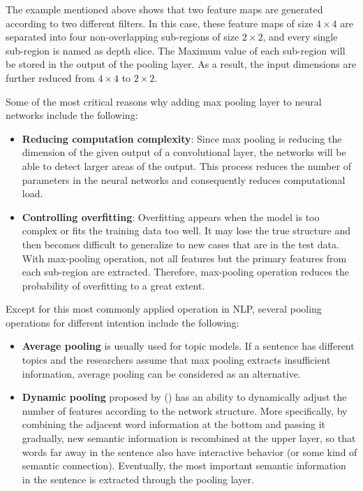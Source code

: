 \documentclass[]{krantz}
\providecommand{\tightlist}{%
  \setlength{\itemsep}{0pt}\setlength{\parskip}{0pt}}
\begin{document}
The example mentioned above shows that two feature maps are generated according to two different filters. In this case, these feature maps of size \(4\times4\) are separated into four non-overlapping sub-regions of size \(2\times2\), and every single sub-region is named as depth slice. The Maximum value of each sub-region will be stored in the output of the pooling layer. As a result, the input dimensions are further reduced from \(4\times4\) to \(2\times2\).

Some of the most critical reasons why adding max pooling layer to neural networks include the following:

\begin{itemize}
\tightlist
\item
  \textbf{Reducing computation complexity}: Since max pooling is reducing the dimension of the given output of a convolutional layer, the networks will be able to detect larger areas of the output. This process reduces the number of parameters in the neural networks and consequently reduces computational load.
\item
  \textbf{Controlling overfitting}: Overfitting appears when the model is too complex or fits the training data too well. It may lose the true structure and then becomes difficult to generalize to new cases that are in the test data. With max-pooling operation, not all features but the primary features from each sub-region are extracted. Therefore, max-pooling operation reduces the probability of overfitting to a great extent.
\end{itemize}

Except for this most commonly applied operation in NLP, several pooling operations for different intention include the following:

\begin{itemize}
\item
  \textbf{Average pooling} is usually used for topic models. If a sentence has different topics and the researchers assume that max pooling extracts insufficient information, average pooling can be considered as an alternative.
\item
  \textbf{Dynamic pooling} proposed by (\citet{Kalchbrenner2014ACN}) has an ability to dynamically adjust the number of features according to the network structure. More specifically, by combining the adjacent word information at the bottom and passing it gradually, new semantic information is recombined at the upper layer, so that words far away in the sentence also have interactive behavior (or some kind of semantic connection). Eventually, the most important semantic information in the sentence is extracted through the pooling layer.
\end{itemize}
\end{document}
